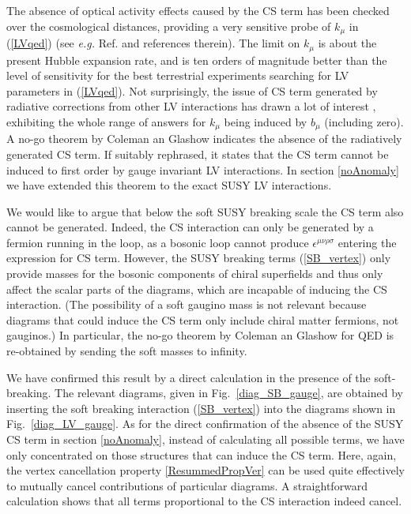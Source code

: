 \documentclass[12pt]{revtex4}
\begin{document}
 
The absence of optical activity effects caused by the CS term has been
checked over the cosmological distances, providing 
a very sensitive probe of $k_\mu$ in (\ref{LVqed}) (see {\em e.g.}
Ref. \cite{CFJ} and references therein). The limit on $k_\mu$ is about
the present Hubble expansion rate, and is ten orders of magnitude
better than the level of sensitivity for the best terrestrial
experiments searching for LV parameters in (\ref{LVqed}). Not
surprisingly, the issue of CS term generated by radiative corrections
from other LV interactions has drawn a lot of interest
\cite{CG,Jackiw:1999yp,Chung:1998jv,Andrianov:2001zj}, exhibiting the
whole range of answers for $k_\mu$ being induced by $b_\mu$ (including
zero). A no-go theorem by Coleman an Glashow \cite{CG}
indicates the absence of the radiatively generated CS
term. If suitably rephrased, it states that the CS term
cannot be induced to first order by gauge invariant LV interactions. 
In section \ref{noAnomaly} we have extended this theorem to the exact
SUSY LV interactions. 


We would like to argue that below the soft SUSY breaking scale the CS term also 
cannot be generated. Indeed, the CS interaction can only be generated
by a fermion running in the loop, as a bosonic loop cannot produce 
$ \epsilon^{\mu\nu\rho\sigma} $ entering the expression for CS term. 
However, the SUSY breaking terms (\ref{SB_vertex}) only 
provide masses for the bosonic components of chiral superfields
and thus only affect the scalar parts of the diagrams, which are 
incapable of inducing the CS interaction. (The possibility of a
soft gaugino mass is not relevant because diagrams that could induce
the CS term only include chiral matter fermions, not gauginos.) 
In particular, the no-go theorem by Coleman an Glashow \cite{CG} for
QED is re-obtained by sending the soft masses to infinity. 


We have confirmed this result by a direct calculation in the presence of
the soft-breaking. The relevant diagrams, given in
Fig.~\ref{diag_SB_gauge}, are obtained by inserting the soft breaking
interaction (\ref{SB_vertex}) into the diagrams shown in
Fig.~\ref{diag_LV_gauge}. As for the direct confirmation of the
absence of the SUSY CS term in section \ref{noAnomaly}, instead of
calculating all possible terms, we have only concentrated on those
structures that can induce the CS term. Here, again, the vertex
cancellation property \eqref{ResummedPropVer} can be used quite
effectively to mutually cancel contributions of particular diagrams.
A straightforward calculation shows that all terms proportional to the
CS interaction indeed cancel. 
\end{document}

